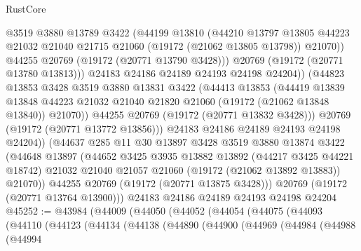 \begin{lexlean}{RustCore}
\begin{coremodule}
                    @3519
                    @3880
                    @13789
                    @3422
                    (@44199
                      @13810
                      (@44210
                        @13797
                        @13805
                        @44223
                        @21032
                        @21040
                        @21715
                        @21060
                        (@19172 (@21062 @13805 @13798))
                        @21070))
                    @44255
                    @20769
                    (@19172 (@20771 @13790 @3428)))
                  @20769
                  (@19172 (@20771 @13780 @13813)))
                @24183
                @24186
                @24189
                @24193
                @24198
                @24204))
            (@44823
              @13853
              @3428
              @3519
              @3880
              @13831
              @3422
              (@44413
                @13853
                (@44419
                  @13839
                  @13848
                  @44223
                  @21032
                  @21040
                  @21820
                  @21060
                  (@19172 (@21062 @13848 @13840))
                  @21070))
              @44255
              @20769
              (@19172 (@20771 @13832 @3428)))
            @20769
            (@19172 (@20771 @13772 @13856)))
          @24183
          @24186
          @24189
          @24193
          @24198
          @24204))
      (@44637
        @285
        @11
        @30
        @13897
        @3428
        @3519
        @3880
        @13874
        @3422
        (@44648
          @13897
          (@44652
            @3425
            @3935
            @13882
            @13892
            (@44217 @3425 @44221 @18742)
            @21032
            @21040
            @21057
            @21060
            (@19172 (@21062 @13892 @13883))
            @21070))
        @44255
        @20769
        (@19172 (@20771 @13875 @3428)))
      @20769
      (@19172 (@20771 @13764 @13900)))
    @24183
    @24186
    @24189
    @24193
    @24198
    @24204
@45252 := @43984
    (@44009
      (@44050
        (@44052
          (@44054
            (@44075
              (@44093
                (@44110
                  (@44123
                    (@44134
                      (@44138
                        (@44890
                          (@44900
                            (@44969
                              (@44984
                                (@44988
                                  (@44994

\end{coremodule}
\end{lexlean}

